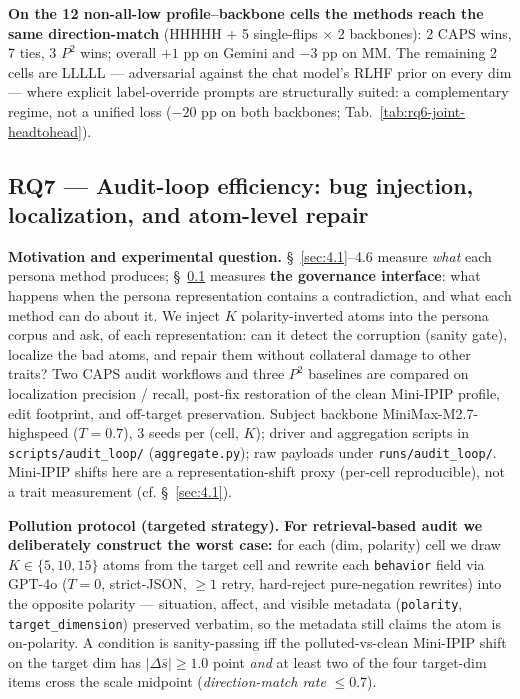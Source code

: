 \textbf{On the 12 non-all-low profile--backbone cells the methods reach the same direction-match} (HHHHH + 5 single-flips $\times$ 2 backbones): 2 CAPS wins, 7 ties, 3 $P^{\!2}$ wins; overall $+1$ pp on Gemini and $-3$ pp on MM. The remaining 2 cells are LLLLL --- adversarial against the chat model's RLHF prior on every dim --- where explicit label-override prompts are structurally suited: a complementary regime, not a unified loss ($-20$ pp on both backbones; Tab.~\ref{tab:rq6-joint-headtohead}).

\subsection{RQ7 --- Audit-loop efficiency: bug injection, localization, and atom-level repair}
\label{sec:4.7}

\textbf{Motivation and experimental question.} \S~\ref{sec:4.1}--4.6 measure \textit{what} each persona method produces; \S~\ref{sec:4.7} measures \textbf{the governance interface}: what happens when the persona representation contains a contradiction, and what each method can do about it. We inject $K$ polarity-inverted atoms into the persona corpus and ask, of each representation: can it detect the corruption (sanity gate), localize the bad atoms, and repair them without collateral damage to other traits? Two CAPS audit workflows and three $P^{\!2}$ baselines are compared on localization precision / recall, post-fix restoration of the clean Mini-IPIP profile, edit footprint, and off-target preservation. Subject backbone MiniMax-M2.7-highspeed ($T = 0.7$), 3 seeds per (cell, $K$); driver and aggregation scripts in \texttt{scripts/\allowbreak{}audit\_\allowbreak{}loop/\allowbreak{}} (\texttt{aggregate.py}); raw payloads under \texttt{runs/\allowbreak{}audit\_\allowbreak{}loop/\allowbreak{}}. Mini-IPIP shifts here are a representation-shift proxy (per-cell reproducible), not a trait measurement (cf. \S~\ref{sec:4.1}).

\textbf{Pollution protocol (targeted strategy).} \textbf{For retrieval-based audit we deliberately construct the worst case:} for each (dim, polarity) cell we draw $K \in \{5, 10, 15\}$ atoms from the target cell and rewrite each \texttt{behavior} field via GPT-4o ($T=0$, strict-JSON, $\geq 1$ retry, hard-reject pure-negation rewrites) into the opposite polarity --- situation, affect, and visible metadata (\texttt{polarity}, \texttt{target\_\allowbreak{}dimension}) preserved verbatim, so the metadata still claims the atom is on-polarity. A condition is sanity-passing iff the polluted-vs-clean Mini-IPIP shift on the target dim has $|\Delta\bar{s}| \geq 1.0$ point \textit{and} at least two of the four target-dim items cross the scale midpoint (\textit{direction-match rate} $\leq 0.7$).

